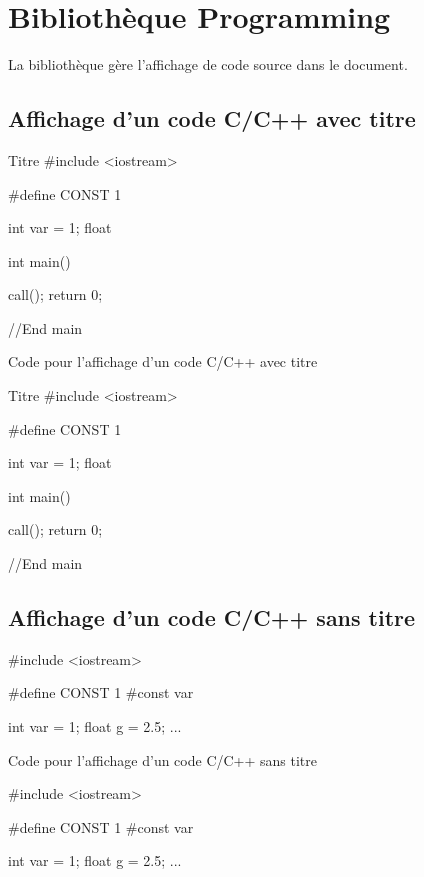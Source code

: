 \chapter{Bibliothèque Programming}

La bibliothèque  gère l'affichage de code source dans le document.\\

\section{Affichage d'un code C/C++ avec titre}


\begin{Cpp}{Titre}
#include <iostream>

#define CONST 1

int var = 1;
float 

int main() {
  
  call();
  return 0;

}//End main

\end{Cpp}

\begin{Latex}{Code pour l'affichage d'un code C/C++ avec titre}
    \begin{Cpp}{Titre}
        #include <iostream>
        
        #define CONST 1
        
        int var = 1;
        float 
        
        int main() {
          
          call();
          return 0;
        
        }//End main
        
        \end{Cpp}
\end{Latex}

\section{Affichage d'un code C/C++ sans titre}


\begin{Cpp}
#include <iostream>

#define CONST 1 #const var

int var = 1;
float g = 2.5;
...

\end{Cpp}

\begin{Latex}{Code pour l'affichage d'un code C/C++ sans titre}
    \begin{Cpp}
        #include <iostream>
        
        #define CONST 1 #const var
        
        int var = 1;
        float g = 2.5;
        ...
        
        \end{Cpp}
\end{Latex}


